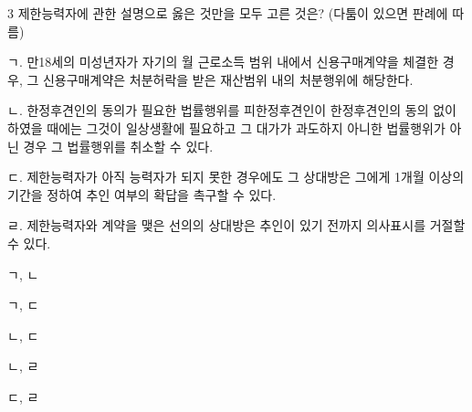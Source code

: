 \begin{question}{3}
제한능력자에 관한 설명으로 옳은 것만을 모두 고른 것은? (다툼이 있으면 판례에 따름)
\begin{framedtext}
ㄱ. 만18세의 미성년자가 자기의 월 근로소득 범위 내에서 신용구매계약을 체결한 경우, 그 신용구매계약은 처분허락을 받은 재산범위 내의 처분행위에 해당한다. \par
ㄴ. 한정후견인의 동의가 필요한 법률행위를 피한정후견인이 한정후견인의 동의 없이 하였을 때에는 그것이 일상생활에 필요하고 그 대가가 과도하지 아니한 법률행위가 아닌 경우 그 법률행위를 취소할 수 있다. \par
ㄷ. 제한능력자가 아직 능력자가 되지 못한 경우에도 그 상대방은 그에게 1개월 이상의 기간을 정하여 추인 여부의 확답을 촉구할 수 있다. \par
ㄹ. 제한능력자와 계약을 맺은 선의의 상대방은 추인이 있기 전까지 의사표시를 거절할 수 있다.
\end{framedtext}
\begin{choices}
  \item ㄱ, ㄴ
  \item ㄱ, ㄷ
  \item ㄴ, ㄷ
  \item ㄴ, ㄹ
  \item ㄷ, ㄹ
\end{choices}
\end{question}

